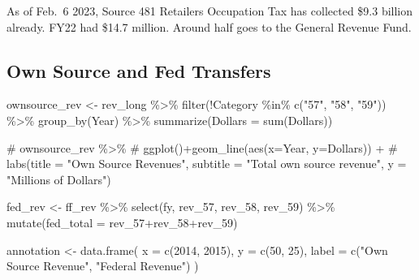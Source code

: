 \documentclass[
  letterpaper,
  DIV=11,
  numbers=noendperiod]{scrreport}
\newenvironment{Shaded}{\begin{snugshade}}{\end{snugshade}}
\newcommand{\AttributeTok}[1]{\textcolor[rgb]{0.40,0.45,0.13}{#1}}
\newcommand{\CommentTok}[1]{\textcolor[rgb]{0.37,0.37,0.37}{#1}}
\newcommand{\DecValTok}[1]{\textcolor[rgb]{0.68,0.00,0.00}{#1}}
\newcommand{\FunctionTok}[1]{\textcolor[rgb]{0.28,0.35,0.67}{#1}}
\newcommand{\NormalTok}[1]{\textcolor[rgb]{0.00,0.23,0.31}{#1}}
\newcommand{\OtherTok}[1]{\textcolor[rgb]{0.00,0.23,0.31}{#1}}
\newcommand{\SpecialCharTok}[1]{\textcolor[rgb]{0.37,0.37,0.37}{#1}}
\newcommand{\StringTok}[1]{\textcolor[rgb]{0.13,0.47,0.30}{#1}}
\begin{document}
As of Feb.~6 2023, Source 481 Retailers Occupation Tax has collected
\$9.3 billion already. FY22 had \$14.7 million. Around half goes to the
General Revenue Fund.

\hypertarget{sec-own-source-and-fed-transfers}{%
\subsection{Own Source and Fed
Transfers}\label{sec-own-source-and-fed-transfers}}

\begin{Shaded}
\begin{Highlighting}[]
\NormalTok{ownsource\_rev }\OtherTok{\textless{}{-}}\NormalTok{ rev\_long }\SpecialCharTok{\%\textgreater{}\%}
  \FunctionTok{filter}\NormalTok{(}\SpecialCharTok{!}\NormalTok{Category }\SpecialCharTok{\%in\%} \FunctionTok{c}\NormalTok{(}\StringTok{"57"}\NormalTok{, }\StringTok{"58"}\NormalTok{, }\StringTok{"59"}\NormalTok{)) }\SpecialCharTok{\%\textgreater{}\%}
  \FunctionTok{group\_by}\NormalTok{(Year) }\SpecialCharTok{\%\textgreater{}\%} 
  \FunctionTok{summarize}\NormalTok{(}\AttributeTok{Dollars =} \FunctionTok{sum}\NormalTok{(Dollars))}

\CommentTok{\# ownsource\_rev \%\textgreater{}\% }
\CommentTok{\#   ggplot()+geom\_line(aes(x=Year, y=Dollars)) + }
\CommentTok{\#   labs(title = "Own Source Revenues", subtitle = "Total own source revenue", y = "Millions of Dollars")}

\NormalTok{fed\_rev }\OtherTok{\textless{}{-}}\NormalTok{ ff\_rev }\SpecialCharTok{\%\textgreater{}\%} \FunctionTok{select}\NormalTok{(fy, rev\_57, rev\_58, rev\_59) }\SpecialCharTok{\%\textgreater{}\%}
  \FunctionTok{mutate}\NormalTok{(}\AttributeTok{fed\_total =}\NormalTok{ rev\_57}\SpecialCharTok{+}\NormalTok{rev\_58}\SpecialCharTok{+}\NormalTok{rev\_59)}


\NormalTok{annotation }\OtherTok{\textless{}{-}} \FunctionTok{data.frame}\NormalTok{(}
  \AttributeTok{x =} \FunctionTok{c}\NormalTok{(}\DecValTok{2014}\NormalTok{, }\DecValTok{2015}\NormalTok{),}
  \AttributeTok{y =} \FunctionTok{c}\NormalTok{(}\DecValTok{50}\NormalTok{, }\DecValTok{25}\NormalTok{),  }
  \AttributeTok{label =} \FunctionTok{c}\NormalTok{(}\StringTok{"Own Source Revenue"}\NormalTok{, }\StringTok{"Federal Revenue"}\NormalTok{)}
\NormalTok{)}



\end{Highlighting}
\end{Shaded}
\end{document}
